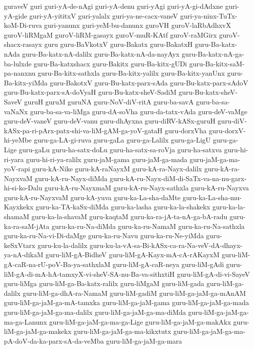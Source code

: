 {guraveV
guri
guri-yA-de-nAgi
guri-yA-denu
guri-yAgi
guri-yA-gi-dAdxne
guri-yA-gide
guri-yA-yititxV
guri-yalalx
guri-ya-ne-cacx-vaneV
guri-ya-ninx-TuTx-koM-Di-ruva
guri-yanunx
guri-yeM-bu-danunx
guroVH
guroV-laRbAdhxvX
guroV-liRMgaM
guroV-liRM-gasayx
guroV-muR-KAtf
guroV-raMGirx
guroV-shacx-rasayx
guru
guru-BaVkotxV
guru-Bakatx
guru-BakatxH
guru-Ba-katx-nAda
guru-Ba-katx-nA-dalilx
guru-Ba-katx-nA-da-nayAyx
guru-Ba-katx-nA-ga-ba-lulxde
guru-Ba-katxshacx
guru-Bakitx
guru-Ba-kitx-gUDi
guru-Ba-kitx-saM-pa-nanxnu
guru-Ba-kitx-sathxla
guru-Ba-kitx-yalilx
guru-Ba-kitx-yanUnx
guru-Ba-kitx-yiMda
guru-BakotxV
guru-Bu-katx-parx-sAda
guru-Bu-katx-parx-sAdoV
guru-Bu-katx-parx-sA-doVyaH
guru-Bu-katx-sheV-SadiM
guru-Bu-katx-sheV-SaveV
guruH
guruM
guruNA
guru-NoV-diV-ritA
guru-ba-savA
guru-ba-sa-vaNaNx
guru-ba-sa-va-liMga
guru-dA-soVha
guru-da-tatx-vAda
guru-deV-vaMge
guru-deV-vaneV
guru-deV-vanu
guru-dhAyxna
guru-diRV-kASx-guruH
guru-diV-kASx-pa-ri-pArx-patx-shi-va-liM-gAM-ga-yoV-gataH
guru-dorxVha
guru-dorxV-hi-yeMbe
guru-ga-LA-gi-ruva
guru-gaLa
guru-ga-Lalilx
guru-ga-LigU
guru-ga-Lige
guru-gaLu
guru-ha-satx-doLu
guru-ha-satx-sa-roVja
guru-ha-satxva
guru-hi-ri-yara
guru-hi-ri-ya-ralilx
guru-jaM-gama
guru-jaM-ga-mada
guru-jaM-ga-ma-yoV-rapi
guru-kA-Nike
guru-kA-raNayxM
guru-kA-ra-Nayx-dalilx
guru-kA-ra-NayxvaM
guru-kA-ru-Nayx-diMda
guru-kA-ru-Nayx-diM-di-SaTx-va-na-nu-garx-hi-si-ko-Dalu
guru-kA-ru-NayxmaM
guru-kA-ru-Nayx-sathxla
guru-kA-ru-Nayxva
guru-kA-ru-NayxvaM
guru-kA-yuva
guru-ka-La-sha-daMte
guru-ka-La-sha-mu-Kayxkekx
guru-ka-TA-kaSx-diMda
guru-ka-lasha
guru-ka-la-shakekx
guru-ka-la-shamaM
guru-ka-la-shavaM
guru-kaqtaM
guru-ka-ra-jA-ta-nA-ga-bA-radu
guru-ka-ra-saM-jAta
guru-ka-ru-Na-diMda
guru-ka-ru-NamaM
guru-ka-ru-Na-sathxla
guru-ka-ru-Na-vi-Di-daMge
guru-ka-ru-Navu
guru-ka-ru-Ne-yiMda
guru-keSxVtarx
guru-ku-la-dalilx
guru-ku-la-vA-sa-Bi-kASx-ca-ra-Na-veV-dA-dhayx-ya-nA-dikaM
guru-liM-gA-BidheV
guru-liM-gA-Kayx-mA-cA-rAKayxM
guru-liM-gA-caR-na-rU-poV-Ba-ya-sathxlaM
guru-liM-gA-caR-neya
guru-liM-gAdi
guru-liM-gA-di-mA-hA-tamxyX-vi-sheV-SA-nu-Ba-va-sithxtiH
guru-liM-gA-di-vi-SayeV
guru-liMga
guru-liM-ga-Ba-katx-ralilx
guru-liMgaM
guru-liM-gada
guru-liM-ga-dalilx
guru-liM-ga-dhA-ra-NamaM
guru-liM-gadiM
guru-liM-ga-jaM-ga-mAnAM
guru-liM-ga-jaM-ga-mA-tamxka
guru-liM-ga-jaM-gama
guru-liM-ga-jaM-ga-mada
guru-liM-ga-jaM-ga-ma-dalilx
guru-liM-ga-jaM-ga-ma-diMda
guru-liM-ga-jaM-ga-ma-ga-Lanunx
guru-liM-ga-jaM-ga-ma-ga-Lige
guru-liM-ga-jaM-ga-makAkx
guru-liM-ga-jaM-ga-makekx
guru-liM-ga-jaM-ga-ma-kikxtutx
guru-liM-ga-jaM-ga-ma-pA-doV-da-ka-parx-sA-da-veMba
guru-liM-ga-jaM-ga-mara
}
